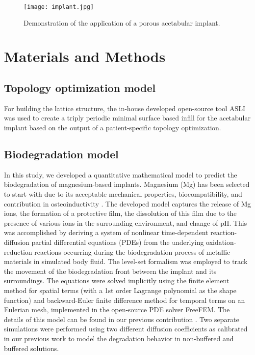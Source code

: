 \begin{figure}[h]
\centering
\medskip
\texttt{[image: implant.jpg]}
\caption[Application of the acetabular implant]{Demonstration of the application of a porous acetabular implant.} \label{fig:cup_implant}
\end{figure}

\section{Materials and Methods}

\subsection{Topology optimization model}

For building the lattice structure, the in-house developed open-source tool ASLI \cite{Perez-Boerema2022} was used to create a triply periodic minimal surface based infill for the acetabular implant based on the output of a patient-specific topology optimization.

\subsection{Biodegradation model}




In this study, we developed a quantitative mathematical model to predict the biodegradation of magnesium-based implants. Magnesium (Mg) has been selected to start with due to its acceptable mechanical properties, biocompatibility, and contribution in osteoinductivity \cite{Agarwal2016}. The developed model captures the release of Mg ions, the formation of a protective film,  the dissolution of this film due to the presence of various ions in the surrounding environment, and change of pH. This was accomplished by deriving a system of nonlinear time-dependent reaction-diffusion partial differential equations (PDEs) from the underlying oxidation-reduction reactions occurring during the biodegradation process of metallic materials in simulated body fluid. The level-set formalism was employed to track the movement of the biodegradation front between the implant and its surroundings. The equations were solved implicitly using the finite element method for spatial terms (with a 1st order Lagrange polynomial as the shape function) and backward-Euler finite difference method for temporal terms on an Eulerian mesh, implemented in the open-source PDE solver FreeFEM\cite{Hecht2012}. The details of this model can be found in our previous contribution \cite{Barzegari2021}. Two separate simulations were performed using two different diffusion coefficients as calibrated in our previous work to model the degradation behavior in non-buffered and buffered solutions.

